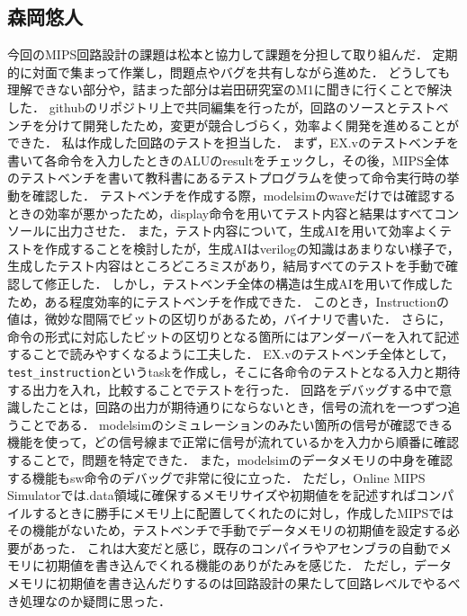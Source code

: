 \documentclass[dvipdfmx]{jsarticle}
\begin{document}
\subsection{森岡悠人}
今回のMIPS回路設計の課題は松本と協力して課題を分担して取り組んだ．
定期的に対面で集まって作業し，問題点やバグを共有しながら進めた．
どうしても理解できない部分や，詰まった部分は岩田研究室のM1に聞きに行くことで解決した．
githubのリポジトリ上で共同編集を行ったが，回路のソースとテストベンチを分けて開発したため，変更が競合しづらく，効率よく開発を進めることができた．
私は作成した回路のテストを担当した．
まず，EX.vのテストベンチを書いて各命令を入力したときのALUのresultをチェックし，その後，MIPS全体のテストベンチを書いて教科書にあるテストプログラムを使って命令実行時の挙動を確認した．
テストベンチを作成する際，modelsimのwaveだけでは確認するときの効率が悪かったため，display命令を用いてテスト内容と結果はすべてコンソールに出力させた．
また，テスト内容について，生成AIを用いて効率よくテストを作成することを検討したが，生成AIはverilogの知識はあまりない様子で，生成したテスト内容はところどころミスがあり，結局すべてのテストを手動で確認して修正した．
しかし，テストベンチ全体の構造は生成AIを用いて作成したため，ある程度効率的にテストベンチを作成できた．
このとき，Instructionの値は，微妙な間隔でビットの区切りがあるため，バイナリで書いた．
さらに，命令の形式に対応したビットの区切りとなる箇所にはアンダーバーを入れて記述することで読みやすくなるように工夫した．
EX.vのテストベンチ全体として，\texttt{test\_instruction}というtaskを作成し，そこに各命令のテストとなる入力と期待する出力を入れ，比較することでテストを行った．
回路をデバッグする中で意識したことは，回路の出力が期待通りにならないとき，信号の流れを一つずつ追うことである．
modelsimのシミュレーションのみたい箇所の信号が確認できる機能を使って，どの信号線まで正常に信号が流れているかを入力から順番に確認することで，問題を特定できた．
また，modelsimのデータメモリの中身を確認する機能もsw命令のデバッグで非常に役に立った．
ただし，Online MIPS Simulatorでは.data領域に確保するメモリサイズや初期値をを記述すればコンパイルするときに勝手にメモリ上に配置してくれたのに対し，作成したMIPSではその機能がないため，テストベンチで手動でデータメモリの初期値を設定する必要があった．
これは大変だと感じ，既存のコンパイラやアセンブラの自動でメモリに初期値を書き込んでくれる機能のありがたみを感じた．
ただし，データメモリに初期値を書き込んだりするのは回路設計の果たして回路レベルでやるべき処理なのか疑問に思った．
\end{document}
